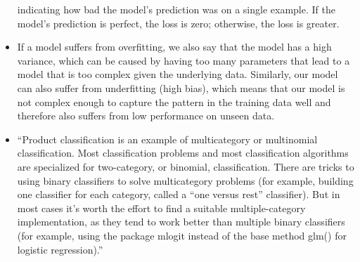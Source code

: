 \documentclass[]{book}
\theoremstyle{definition}
\theoremstyle{definition}
\theoremstyle{definition}
\theoremstyle{remark}
\begin{document}
\begin{itemize}
  indicating how bad the model's prediction was on a single example. If
  the model's prediction is perfect, the loss is zero; otherwise, the
  loss is greater.
\item
  If a model suffers from overfitting, we also say that the model has a
  high variance, which can be caused by having too many parameters that
  lead to a model that is too complex given the underlying data.
  Similarly, our model can also suffer from underfitting (high bias),
  which means that our model is not complex enough to capture the
  pattern in the training data well and therefore also suffers from low
  performance on unseen data.
\item
  ``Product classification is an example of multicategory or multinomial
  classification. Most classification problems and most classification
  algorithms are specialized for two-category, or binomial,
  classification. There are tricks to using binary classifiers to solve
  multicategory problems (for example, building one classifier for each
  category, called a ``one versus rest'' classifier). But in most cases
  it's worth the effort to find a suitable multiple-category
  implementation, as they tend to work better than multiple binary
  classifiers (for example, using the package mlogit instead of the base
  method glm() for logistic regression).''
\end{itemize}


\end{document}
